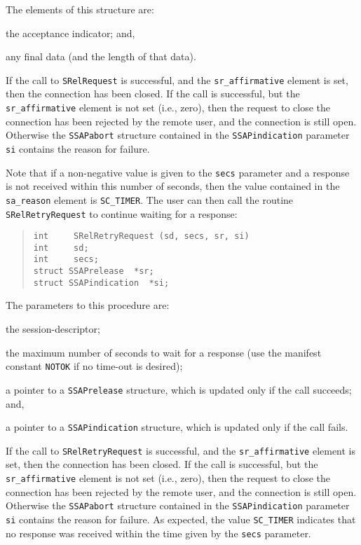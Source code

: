 The elements of this structure are:
\begin{describe}
\item[\verb"sr\_affirmative":] the acceptance indicator;
and,

\item[\verb"sr\_data"/\verb"sr\_cc":] any final data
(and the length of that data).
\end{describe}
If the call to \verb"SRelRequest" is successful,
and the \verb"sr_affirmative" element is set,
then the connection has been closed.
If the call is successful,
but the \verb"sr_affirmative" element is not set (i.e., zero),
then the request to close the connection has been rejected by the remote user,
and the connection is still open.
Otherwise the \verb"SSAPabort" structure contained in
the \verb"SSAPindication" parameter
\verb"si" contains the reason for failure.

Note that if a non-negative value is given to the \verb"secs" parameter and a
response is not received within this number of seconds,
then the value contained in the \verb"sa_reason" element is \verb"SC_TIMER".
The user can then call the routine \verb"SRelRetryRequest" to continue waiting
for a response:
\begin{quote}\small\begin{verbatim}
int     SRelRetryRequest (sd, secs, sr, si)
int     sd;
int     secs;
struct SSAPrelease  *sr;
struct SSAPindication  *si;
\end{verbatim}\end{quote}
The parameters to this procedure are:
\begin{describe}
\item[\verb"sd":] the session-descriptor;

\item[\verb"secs":] the maximum number of seconds to wait for a response
(use the manifest constant \verb"NOTOK" if no time-out is desired);

\item[\verb"sr":] a pointer to a \verb"SSAPrelease" structure, which is updated
only if the call succeeds;
and,

\item[\verb"si":] a pointer to a \verb"SSAPindication" structure, which is updated
only if the call fails.
\end{describe}
If the call to \verb"SRelRetryRequest" is successful,
and the \verb"sr_affirmative" element is set,
then the connection has been closed.
If the call is successful,
but the \verb"sr_affirmative" element is not set (i.e., zero),
then the request to close the connection has been rejected by the remote user,
and the connection is still open.
Otherwise the \verb"SSAPabort" structure contained in
the \verb"SSAPindication" parameter
\verb"si" contains the reason for failure.
As expected,
the value \verb"SC_TIMER" indicates that no response was received within the
time given by the \verb"secs" parameter.

